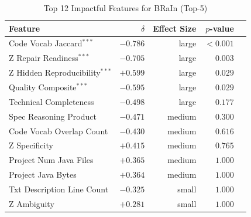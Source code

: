 
\begin{table}[h]
\centering
\caption{Top 12 Impactful Features for BRaIn (Top-5)}
\label{tab:tool_features_brain_top5}
\begin{tabular}{lrrrr}
\toprule
Feature & $\delta$ & Effect Size & $p$-value \\
\midrule
Code Vocab Jaccard$^{***}$ & $-0.786$ & large & $<0.001$ \\
Z Repair Readiness$^{***}$ & $-0.705$ & large & $0.003$ \\
Z Hidden Reproducibility$^{***}$ & $+0.599$ & large & $0.029$ \\
Quality Composite$^{***}$ & $-0.595$ & large & $0.029$ \\
Technical Completeness & $-0.498$ & large & $0.177$ \\
Spec Reasoning Product & $-0.471$ & medium & $0.300$ \\
Code Vocab Overlap Count & $-0.430$ & medium & $0.616$ \\
Z Specificity & $+0.415$ & medium & $0.765$ \\
Project Num Java Files & $+0.365$ & medium & $1.000$ \\
Project Java Bytes & $+0.364$ & medium & $1.000$ \\
Txt Description Line Count & $-0.325$ & small & $1.000$ \\
Z Ambiguity & $+0.281$ & small & $1.000$ \\
\bottomrule
\end{tabular}
\end{table}

